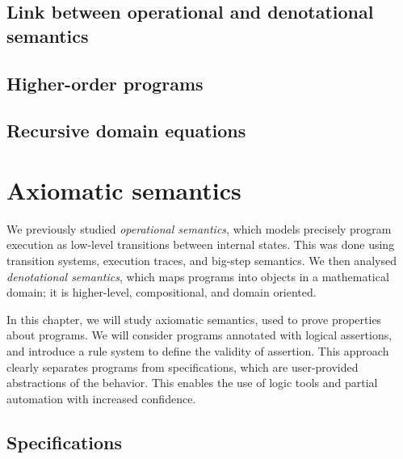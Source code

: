 \documentclass[toc]{../cs-classes/cs-classes}
\begin{document}
\subsection{Link between operational and denotational semantics}

\subsection{Higher-order programs}

\subsection{Recursive domain equations}


\section{Axiomatic semantics}
We previously studied \emph{operational semantics}, which models precisely program execution as low-level transitions between internal states. This was done using transition systems, execution traces, and big-step semantics. We then analysed \emph{denotational semantics}, which maps programs into objects in a mathematical domain; it is higher-level, compositional, and domain oriented. 

In this chapter, we will study axiomatic semantics, used to prove properties about programs. We will consider programs annotated with logical assertions, and introduce a rule system to define the validity of assertion. This approach clearly separates programs from specifications, which are user-provided abstractions of the behavior. This enables the use of logic tools and partial automation with increased confidence.

\subsection{Specifications}
\end{document}
